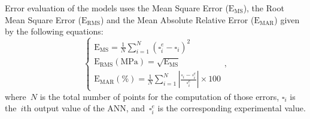 \documentclass[algorithms,article,submit,pdftex,oneauthors]{Definitions/mdpi}
\DeclareRobustCommand{\MSE}{\text{E}_\text{MS}}
\DeclareRobustCommand{\RMSE}{\text{E}_\text{RMS}}
\DeclareRobustCommand{\MARE}{\text{E}_\text{MAR}}
\DeclareRobustCommand{\MPa}{\text{MPa}}
\begin{document}
Error evaluation of the models uses the Mean Square Error ($\MSE$), the Root Mean Square Error ($\RMSE$) and the Mean Absolute Relative Error ($\MARE$) given by the following equations:
\begin{equation}
\begin{cases}
\MSE = \frac{1}{N} \sum_{i=1}^{N} \left(\square_i^e - \square_i\right)^2\\
\RMSE (\MPa) = \sqrt{\MSE}\\
\MARE(\%) = \frac{1}{N} \sum_{i=1}^{N}{\left|\frac{\square_i -\square_i^e}{\square_i^e}\right|} \times 100
\end{cases},
\label{eq:Errors}
\end{equation}
where~$N$ is the total number of points for the computation of those errors, $\square_i$ is the~$i$th output value of the ANN, and~$\square_i^e$ is the corresponding experimental value.
\end{document}
